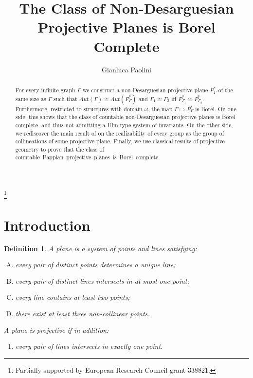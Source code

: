 \documentclass{amsart}
\newtheorem{definition}[theorem]{Definition}
\numberwithin{claimcounter}{theorem}
\begin{document}

\begin{abstract} For every infinite graph $\Gamma$ we construct a non-Desarguesian projective plane $P^*_{\Gamma}$ of the same size as $\Gamma$ such that $Aut(\Gamma) \cong Aut(P^*_{\Gamma})$ and $\Gamma_1 \cong \Gamma_2$ iff $P^*_{\Gamma_1} \cong P^*_{\Gamma_2}$. Furthermore, restricted to structures with domain $\omega$, the map $\Gamma \mapsto P^*_{\Gamma}$ is Borel. On one side, this shows that the class of countable non-Desarguesian projective planes is Borel complete, and thus not admitting a Ulm type system of invariants. On the other side, we rediscover the main result of \cite{projective} on the realizability of every group as the group of collineations of some projective plane. Finally, we use classical results of projective geometry to prove that the class of \mbox{countable Pappian projective planes is Borel complete.}
\end{abstract}

\title{The Class of Non-Desarguesian Projective Planes is Borel Complete}
\thanks{Partially supported by European Research Council grant 338821.}


\author{Gianluca Paolini}
\address{Einstein Institute of Mathematics,  The Hebrew University of Jerusalem, Israel}

\maketitle

\section{Introduction}

	
	\begin{definition}\label{def_plane} A {\em plane} is a system of points and lines satisfying:
	\begin{enumerate}[(A)]
	\item every pair of distinct points determines a unique line;
	\item every pair of distinct lines intersects in at most one point;
	\item every line contains at least two points;
	\item there exist at least three non-collinear points.
\end{enumerate}
A plane is {\em projective} if in addition:
	\begin{enumerate}[(B')]
	\item every pair of lines intersects in exactly one point.
\end{enumerate}
\end{definition}
	
\end{document}
